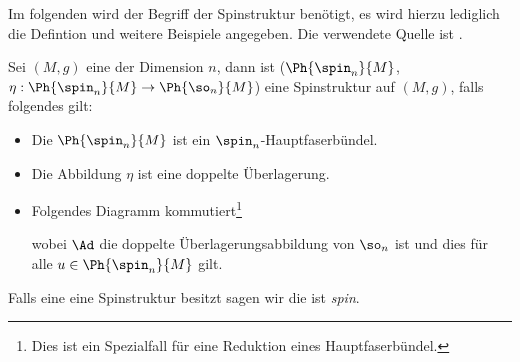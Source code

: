 Im folgenden wird der Begriff der Spinstruktur benötigt, es wird
hierzu lediglich die Defintion und weitere Beispiele angegeben.  Die
verwendete Quelle ist \cite{BHMMM15}.   
\begin{Def}[Spinstruktur]
  Sei $(M,g)$ eine \RMF der Dimension $n$, dann ist
  ($\Ph{\spin_n}{M}$,$\eta : \Ph{\spin_n}{M} \rightarrow
  \Ph{\so_n}{M}$) eine Spinstruktur auf $(M,g)$, falls folgendes gilt:
	 \begin{itemize}
         \item Die \mfg $\Ph{\spin_n}{M}$ ist ein
           $\spin_n$-Hauptfaserbündel.
         \item Die Abbildung $\eta$ ist eine doppelte Überlagerung.
         \item Folgendes Diagramm kommutiert\footnote{Dies ist ein Spezialfall für eine Reduktion eines Hauptfaserbündel.}\\
           \begin{center}
			 \end{center}
                         wobei $\Ad$ die doppelte
                         Überlagerungsabbildung von $\so_n$ ist und
                         dies für alle $u \in \Ph{\spin_n}{M}$ gilt.
	 \end{itemize}
	 Falls eine \RMF eine Spinstruktur besitzt sagen wir die \mfg
         ist \textit{spin}.
	

\end{Def}

